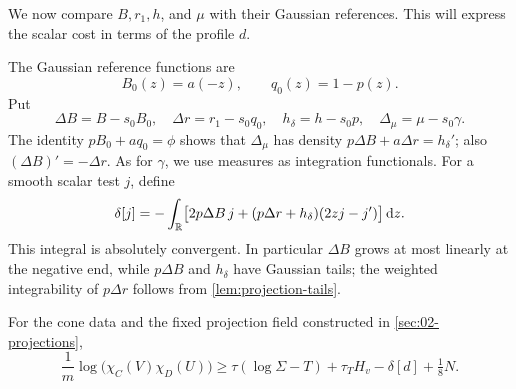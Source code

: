 We now compare $B,r_1,h$, and $\mu$ with their Gaussian references. This will express the scalar cost in terms of the profile $d$.

The Gaussian reference functions are
\[
B_0(z)=a(-z),\qquad q_0(z)=1-p(z).
\]
Put
\[
\Delta B=B-s_0B_0,\quad \Delta r=r_1-s_0q_0,\quad
h_\delta=h-s_0p,\quad \Delta_\mu=\mu-s_0\gamma.
\]
The identity $pB_0+aq_0=\phi$ shows that $\Delta_\mu$ has density $p\Delta B+a\Delta r=h_\delta'$; also $(\Delta B)'=-\Delta r$. As for $\gamma$, we use measures as integration functionals. For a smooth scalar test $j$, define
\begin{equation}
\delta[j]=-
\int_{\mathbb{R}}\bigl[2p\Delta B\,j+(p\Delta r+h_\delta)(2zj-j')\bigr]\,\mathrm{d} z.
\label{eq:derivative-error}
\end{equation}
This integral is absolutely convergent. In particular $\Delta B$ grows at most linearly at the negative end, while $p\Delta B$ and $h_\delta$ have Gaussian tails; the weighted integrability of $p\Delta r$ follows from \cref{lem:projection-tails}.

\begin{proposition}\label{prop:entropy}
For the cone data and the fixed projection field constructed in \cref{sec:02-projections},
\begin{equation}
\frac1m\log\bigl(\chi_C(V)\chi_D(U)\bigr)
\ge \tau(\log\Sigma-T)+\tau_T H_v-\delta[d]+\tfrac18N.
\label{eq:laplace-lower-bound}
\end{equation}
\end{proposition}

